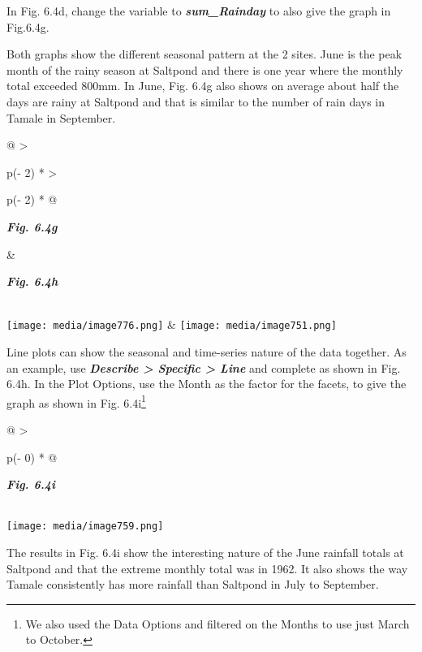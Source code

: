 \documentclass[
  letterpaper,
  DIV=11,
  numbers=noendperiod]{scrreprt}
\begin{document}
In Fig. 6.4d, change the variable to \textbf{\emph{sum\_Rainday}} to
also give the graph in Fig.6.4g.

Both graphs show the different seasonal pattern at the 2 sites. June is
the peak month of the rainy season at Saltpond and there is one year
where the monthly total exceeded 800mm. In June, Fig. 6.4g also shows on
average about half the days are rainy at Saltpond and that is similar to
the number of rain days in Tamale in September.

\begin{longtable}[]{@{}
  >{\raggedright\arraybackslash}p{(\columnwidth - 2\tabcolsep) * }
  >{\raggedright\arraybackslash}p{(\columnwidth - 2\tabcolsep) * }@{}}
\toprule\noalign{}
\begin{minipage}[b]{\linewidth}\raggedright
\textbf{\emph{Fig. 6.4g}}
\end{minipage} & \begin{minipage}[b]{\linewidth}\raggedright
\textbf{\emph{Fig. 6.4h}}
\end{minipage} \\
\midrule\noalign{}
\endhead
\bottomrule\noalign{}
\endlastfoot
\texttt{[image: media/image776.png]} &
\texttt{[image: media/image751.png]} \\
\end{longtable}

Line plots can show the seasonal and time-series nature of the data
together. As an example, use \textbf{\emph{Describe \textgreater{}
Specific \textgreater{} Line}} and complete as shown in Fig. 6.4h. In
the Plot Options, use the Month as the factor for the facets, to give
the graph as shown in Fig. 6.4i\footnote{We also used the Data Options
  and filtered on the Months to use just March to October.}

\begin{longtable}[]{@{}
  >{\raggedright\arraybackslash}p{(\columnwidth - 0\tabcolsep) * }@{}}
\toprule\noalign{}
\begin{minipage}[b]{\linewidth}\raggedright
\textbf{\emph{Fig. 6.4i}}
\end{minipage} \\
\midrule\noalign{}
\endhead
\bottomrule\noalign{}
\endlastfoot
\texttt{[image: media/image759.png]} \\
\end{longtable}

The results in Fig. 6.4i show the interesting nature of the June
rainfall totals at Saltpond and that the extreme monthly total was in
1962. It also shows the way Tamale consistently has more rainfall than
Saltpond in July to September.
\end{document}
